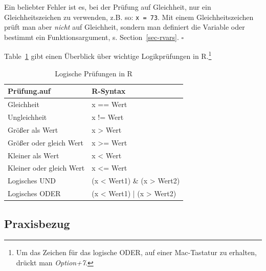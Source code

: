 \documentclass[
  letterpaper,
  DIV=11,
  numbers=noendperiod]{scrartcl}
\theoremstyle{definition}
\theoremstyle{definition}
\theoremstyle{definition}
\theoremstyle{remark}
\begin{document}
\begin{tcolorbox}[enhanced jigsaw, coltitle=black, colframe=quarto-callout-caution-color-frame, opacityback=0, toprule=.15mm, opacitybacktitle=0.6, arc=.35mm, titlerule=0mm, toptitle=1mm, title=\textcolor{quarto-callout-caution-color}{\faFire}\hspace{0.5em}{Caution}, bottomtitle=1mm, leftrule=.75mm, breakable, rightrule=.15mm, colbacktitle=quarto-callout-caution-color!10!white, bottomrule=.15mm, colback=white, left=2mm]

Ein beliebter Fehler ist es, bei der Prüfung auf Gleichheit, nur ein
Gleichheitszeichen zu verwenden, z.B. so: \texttt{x\ =\ 73}. Mit einem
Gleichheitszeichen prüft man aber \emph{nicht} auf Gleichheit, sondern
man definiert die Variable oder bestimmt ein Funktionsargument, s.
Section~\ref{sec-rvars}. \(\square\)

\end{tcolorbox}

Table~\ref{tbl-lgl} gibt einen Überblick über wichtige Logikprüfungen in
R.\footnote{Um das Zeichen für das logische ODER, \texttt{\textbar{}}
  auf einer Mac-Tastatur zu erhalten, drückt man \emph{Option+7}.}

\begin{longtable}{ll}

\caption{\label{tbl-lgl}Logische Prüfungen in R}

\tabularnewline

\toprule
Prüfung.auf & R-Syntax \\ 
\midrule\addlinespace[2.5pt]
Gleichheit & x == Wert \\ 
Ungleichheit & x != Wert \\ 
Größer als Wert & x > Wert \\ 
Größer oder gleich Wert & x >= Wert \\ 
Kleiner als Wert & x < Wert \\ 
Kleiner oder gleich Wert & x <= Wert \\ 
Logisches UND & (x < Wert1) \& (x > Wert2) \\ 
Logisches ODER & (x < Wert1) | (x > Wert2) \\ 
\bottomrule

\end{longtable}

\subsection{Praxisbezug}\label{praxisbezug}
\end{document}
